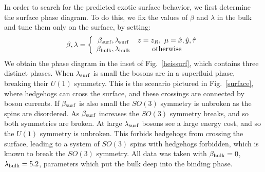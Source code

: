 \documentclass[prb,twocolumn]{revtex4-1}
\begin{document}
In order to search for the predicted exotic surface behavior, we first determine the surface phase diagram.
To do this, we fix the values of $\beta$ and $\lambda$ in the bulk and tune them only on the surface, by setting:
\begin{equation}
\beta,\lambda=\left\{
\begin{array}{cc}
\beta_{\rm surf},\lambda_{\rm surf} & z=z_R,~\mu=\hat{x},\hat{y},\hat{\tau}\\
\beta_{\rm bulk},\lambda_{\rm bulk} & {\rm otherwise }
\end{array}\right.
\label{bulkvsurf}
\end{equation}
We obtain the phase diagram in the inset of Fig.~\ref{heissurf}, which contains three distinct phases. When $\lambda_{\rm surf}$ is small the bosons are in a superfluid phase, breaking their $U(1)$ symmetry. This is the scenario pictured in Fig.~\ref{surface}, where hedgehogs can cross the surface, and these crossings are connected by boson currents. If $\beta_{\rm surf}$ is also small the $SO(3)$ symmetry is unbroken as the spins are disordered. As $\beta_{\rm surf}$ increases the $SO(3)$ symmetry breaks, and so both symmetries are broken. At large $\lambda_{\rm surf}$ bosons see a large energy cost, and so the $U(1)$ symmetry is unbroken. This forbids hedgehogs from crossing the surface, leading to a system of $SO(3)$ spins with hedgehogs forbidden, which is known to break the $SO(3)$ symmetry.\cite{LauDasgupta} All data was taken with $\beta_{\rm bulk}=0$, $\lambda_{\rm bulk}=5.2$, parameters which put the bulk deep into the binding phase.
\end{document}
